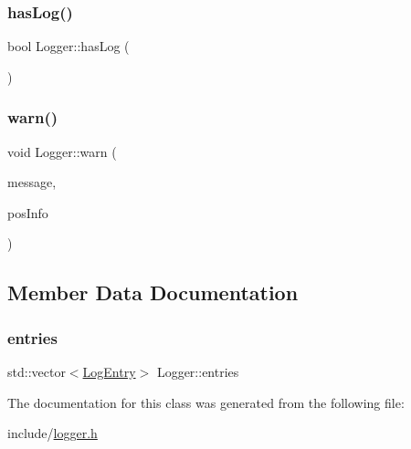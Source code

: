 \subsubsection{\texorpdfstring{has\+Log()}{hasLog()}}
{\footnotesize\ttfamily bool Logger\+::has\+Log (\begin{DoxyParamCaption}{ }\end{DoxyParamCaption})}

\mbox{\label{classLogger_a31d66ebf52bace306ed8a8f0e0b1f516}} 
\subsubsection{\texorpdfstring{warn()}{warn()}}
{\footnotesize\ttfamily void Logger\+::warn (\begin{DoxyParamCaption}\item[{std\+::string}]{message,  }\item[{\hyperlink{classPosInfo}{Pos\+Info}}]{pos\+Info }\end{DoxyParamCaption})}



\subsection{Member Data Documentation}
\mbox{\label{classLogger_a151c8e1606c22b796aa5ed817a1b5a54}} 
\subsubsection{\texorpdfstring{entries}{entries}}
{\footnotesize\ttfamily std\+::vector$<$\hyperlink{classLogEntry}{Log\+Entry}$>$ Logger\+::entries}



The documentation for this class was generated from the following file\+:\begin{DoxyCompactItemize}
\item 
include/\hyperlink{logger_8h}{logger.\+h}\end{DoxyCompactItemize}
